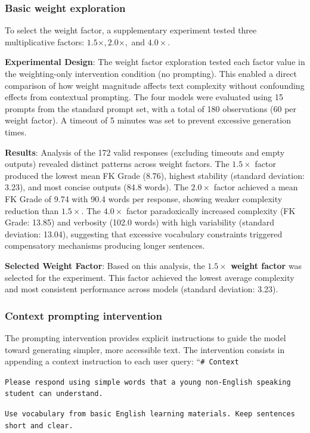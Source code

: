\documentclass[10pt, a4paper]{article}
\begin{document}
\subsubsection{Basic weight exploration}
To select the weight factor, a supplementary experiment tested three multiplicative factors: $1.5×, 2.0×,$ and $4.0×$.

\textbf{Experimental Design}: The weight factor exploration tested each factor value in the weighting-only intervention condition (no prompting). This enabled a direct comparison of how weight magnitude affects text complexity without confounding effects from contextual prompting. The four models were evaluated using 15 prompts from the standard prompt set, with a total of 180 observations (60 per weight factor). A timeout of 5 minutes was set to prevent excessive generation times.

\textbf{Results}: Analysis of the 172 valid responses (excluding timeouts and empty outputs) revealed distinct patterns across weight factors. The $1.5×$ factor produced the lowest mean FK Grade (8.76), highest stability (standard deviation: 3.23), and most concise outputs (84.8 words). The $2.0×$ factor achieved a mean FK Grade of 9.74 with 90.4 words per response, showing weaker complexity reduction than $1.5×$. The $4.0×$ factor paradoxically increased complexity (FK Grade: 13.85) and verbosity (102.0 words) with high variability (standard deviation: 13.04), suggesting that excessive vocabulary constraints triggered compensatory mechanisms producing longer sentences.

\textbf{Selected Weight Factor}: Based on this analysis, the \textbf{$1.5×$ weight factor} was selected for the experiment. This factor achieved the lowest average complexity and most consistent performance across models (standard deviation: 3.23).

\subsubsection{Context prompting intervention}
The prompting intervention provides explicit instructions to guide the model toward generating simpler, more accessible text. The intervention consists in appending a context instruction to each user query:
``\texttt{\# Context}

\texttt{Please respond using simple words that a young non-English speaking student can understand.} 

\texttt{Use vocabulary from basic English learning materials. Keep sentences short and clear.}
\end{document}
